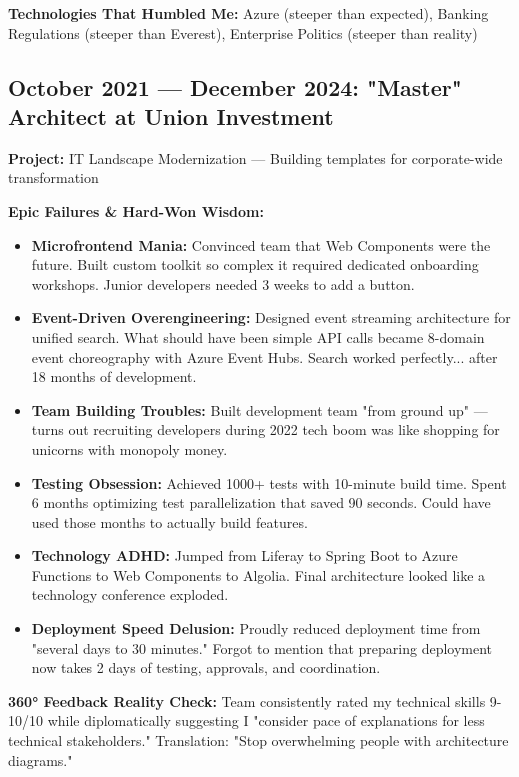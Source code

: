 \documentclass[11pt,a4paper]{article}
\begin{document}
\textbf{Technologies That Humbled Me:} Azure (steeper than expected), Banking Regulations (steeper than Everest), Enterprise Politics (steeper than reality)

\subsection*{October 2021 — December 2024: "Master" Architect at Union Investment}

\textbf{Project:} IT Landscape Modernization — Building templates for corporate-wide transformation

\textbf{Epic Failures \& Hard-Won Wisdom:}
\begin{itemize}[leftmargin=1.5em,itemsep=0.2em]
\item \textbf{Microfrontend Mania:} Convinced team that Web Components were the future. Built custom toolkit so complex it required dedicated onboarding workshops. Junior developers needed 3 weeks to add a button.
\item \textbf{Event-Driven Overengineering:} Designed event streaming architecture for unified search. What should have been simple API calls became 8-domain event choreography with Azure Event Hubs. Search worked perfectly... after 18 months of development.
\item \textbf{Team Building Troubles:} Built development team "from ground up" — turns out recruiting developers during 2022 tech boom was like shopping for unicorns with monopoly money.
\item \textbf{Testing Obsession:} Achieved 1000+ tests with 10-minute build time. Spent 6 months optimizing test parallelization that saved 90 seconds. Could have used those months to actually build features.
\item \textbf{Technology ADHD:} Jumped from Liferay to Spring Boot to Azure Functions to Web Components to Algolia. Final architecture looked like a technology conference exploded.
\item \textbf{Deployment Speed Delusion:} Proudly reduced deployment time from "several days to 30 minutes." Forgot to mention that preparing deployment now takes 2 days of testing, approvals, and coordination.
\end{itemize}

\textbf{360° Feedback Reality Check:} Team consistently rated my technical skills 9-10/10 while diplomatically suggesting I "consider pace of explanations for less technical stakeholders." Translation: "Stop overwhelming people with architecture diagrams."
\end{document}
